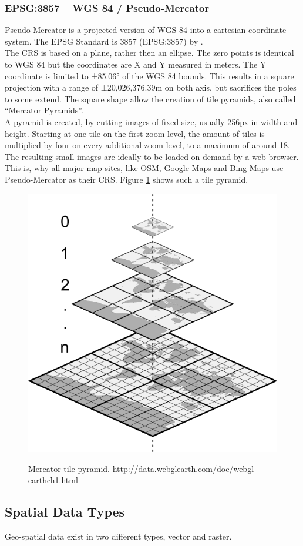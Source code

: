 \subsubsection{EPSG:3857 -- WGS 84 / Pseudo-Mercator}
Pseudo-Mercator is a projected version of WGS 84 into a cartesian coordinate system. The EPSG Standard is 3857 (EPSG:3857) by \cite{Grafarend1995}.\\
The CRS is based on a plane, rather then an ellipse. The zero points is identical to WGS 84 but the coordinates are X and Y measured in meters. The Y coordinate is limited to ±85.06° of the WGS 84 bounds. This results in a square projection with a range of ±20,026,376.39m on both axis, but sacrifices the poles to some extend. The square shape allow the creation of tile pyramids, also called \enquote{Mercator Pyramids}. \\
A pyramid is created, by cutting images of fixed size, usually 256px in width and height. Starting at one tile on the first zoom level, the amount of tiles is multiplied by four on every additional zoom level, to a maximum of around 18. \\
The resulting small images are ideally to be loaded on demand by a web browser. This is, why all major map sites, like OSM, Google Maps and Bing Maps use Pseudo-Mercator as their CRS. Figure \ref{img:mercator-pyramid} shows such a tile pyramid.
\begin{figure}[H]
	\centering
	\includegraphics[width=0.4\columnwidth]{res/mercator-pyramid}\\
	\caption[]{Mercator tile pyramid. \url{http://data.webglearth.com/doc/webgl-earthch1.html}}
	\label{img:mercator-pyramid}
\end{figure}


\subsection{Spatial Data Types}
Geo-spatial data exist in two different types, vector and raster. 

